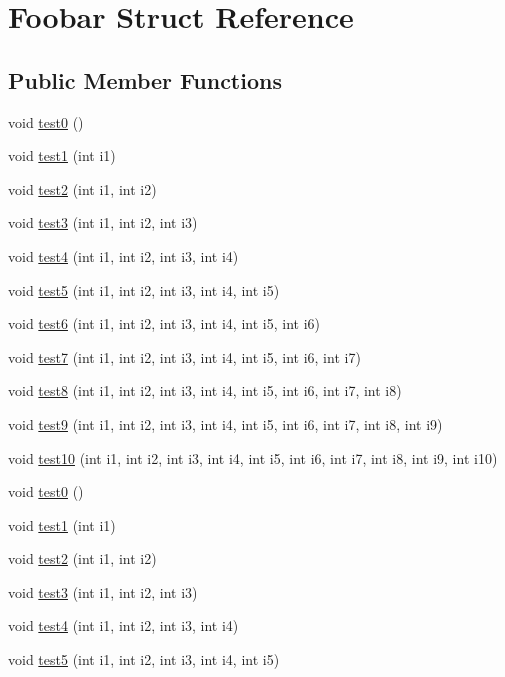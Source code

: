 \hypertarget{structFoobar}{
\section{Foobar Struct Reference}
\label{structFoobar}
}
\subsection*{Public Member Functions}
\begin{CompactItemize}
\item 
void \hyperlink{structFoobar_a0}{test0} ()
\item 
void \hyperlink{structFoobar_a1}{test1} (int i1)
\item 
void \hyperlink{structFoobar_a2}{test2} (int i1, int i2)
\item 
void \hyperlink{structFoobar_a3}{test3} (int i1, int i2, int i3)
\item 
void \hyperlink{structFoobar_a4}{test4} (int i1, int i2, int i3, int i4)
\item 
void \hyperlink{structFoobar_a5}{test5} (int i1, int i2, int i3, int i4, int i5)
\item 
void \hyperlink{structFoobar_a6}{test6} (int i1, int i2, int i3, int i4, int i5, int i6)
\item 
void \hyperlink{structFoobar_a7}{test7} (int i1, int i2, int i3, int i4, int i5, int i6, int i7)
\item 
void \hyperlink{structFoobar_a8}{test8} (int i1, int i2, int i3, int i4, int i5, int i6, int i7, int i8)
\item 
void \hyperlink{structFoobar_a9}{test9} (int i1, int i2, int i3, int i4, int i5, int i6, int i7, int i8, int i9)
\item 
void \hyperlink{structFoobar_a10}{test10} (int i1, int i2, int i3, int i4, int i5, int i6, int i7, int i8, int i9, int i10)
\item 
void \hyperlink{structFoobar_a11}{test0} ()
\item 
void \hyperlink{structFoobar_a12}{test1} (int i1)
\item 
void \hyperlink{structFoobar_a13}{test2} (int i1, int i2)
\item 
void \hyperlink{structFoobar_a14}{test3} (int i1, int i2, int i3)
\item 
void \hyperlink{structFoobar_a15}{test4} (int i1, int i2, int i3, int i4)
\item 
void \hyperlink{structFoobar_a16}{test5} (int i1, int i2, int i3, int i4, int i5)
\item 

\end{CompactItemize}
